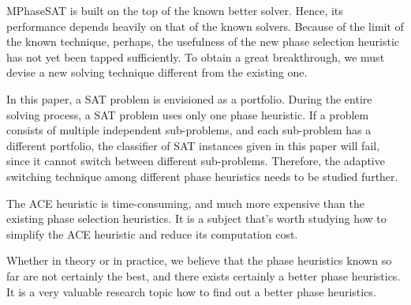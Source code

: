 \documentclass{llncs}
\begin{document}
MPhaseSAT is built on the top of the known better solver. Hence, its
performance depends heavily on that of the known solvers. Because of
the limit of the known technique, perhaps, the usefulness of the new
phase selection heuristic has not yet been tapped sufficiently. To
obtain a great breakthrough, we must devise a new solving technique
different from the existing one.

In this paper, a SAT problem is envisioned as a portfolio. During
the entire solving process, a SAT problem uses only one phase
heuristic. If a problem consists of multiple independent
sub-problems, and each sub-problem has a different portfolio, the
classifier of SAT instances given in this paper will fail, since it
cannot switch between different sub-problems. Therefore, the
adaptive switching technique among different phase heuristics needs
to be studied further.

The ACE heuristic is time-consuming, and much more expensive than
the existing phase selection heuristics. It is a subject that's
worth studying how to simplify the ACE heuristic and reduce its
computation cost.

Whether in theory or in practice, we believe that the phase
heuristics known so far are not certainly the best, and there exists
certainly a better phase heuristics. It is a very valuable research
topic how to find out a better phase heuristics.



\end{document}
